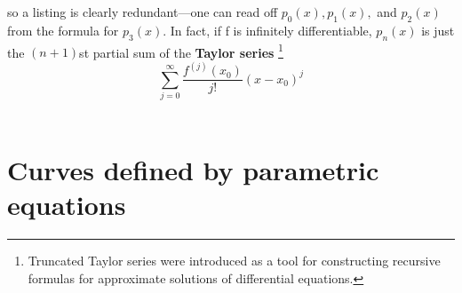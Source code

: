 \documentclass{article}
\begin{document}
so a listing is clearly redundant—one can read off \begin{math} p_0(x),p_1(x), \end{math} and \begin{math} p_2(x) \end{math} from the formula for \begin{math} p_3(x) \end{math}. In fact, if f is infinitely differentiable, \begin{math} p_n(x) \end{math} is just the \begin{math} (n + 1) \end{math}st partial sum of the \textbf{Taylor series} \footnote{Truncated Taylor series were introduced as a tool for constructing recursive formulas for approximate solutions of differential equations.}\\

\begin{equation}
    \sum\limits_{j=0}^{\infty} \frac{f^{(j)}(x_0)}{j!}(x-x_0)^j
\end{equation}\\


\section{Curves defined by parametric equations}
\end{document}
